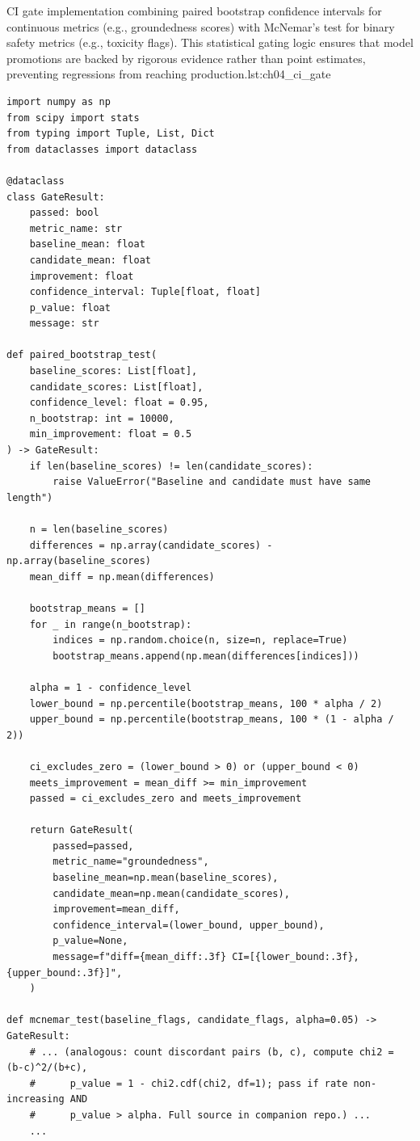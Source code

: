 \begin{codebox}{CI gate implementation combining paired bootstrap confidence intervals for continuous metrics (e.g., groundedness scores) with McNemar's test for binary safety metrics (e.g., toxicity flags). This statistical gating logic ensures that model promotions are backed by rigorous evidence rather than point estimates, preventing regressions from reaching production.}{lst:ch04_ci_gate}
\begin{verbatim}
import numpy as np
from scipy import stats
from typing import Tuple, List, Dict
from dataclasses import dataclass

@dataclass
class GateResult:
    passed: bool
    metric_name: str
    baseline_mean: float
    candidate_mean: float
    improvement: float
    confidence_interval: Tuple[float, float]
    p_value: float
    message: str

def paired_bootstrap_test(
    baseline_scores: List[float],
    candidate_scores: List[float],
    confidence_level: float = 0.95,
    n_bootstrap: int = 10000,
    min_improvement: float = 0.5
) -> GateResult:
    if len(baseline_scores) != len(candidate_scores):
        raise ValueError("Baseline and candidate must have same length")

    n = len(baseline_scores)
    differences = np.array(candidate_scores) - np.array(baseline_scores)
    mean_diff = np.mean(differences)

    bootstrap_means = []
    for _ in range(n_bootstrap):
        indices = np.random.choice(n, size=n, replace=True)
        bootstrap_means.append(np.mean(differences[indices]))

    alpha = 1 - confidence_level
    lower_bound = np.percentile(bootstrap_means, 100 * alpha / 2)
    upper_bound = np.percentile(bootstrap_means, 100 * (1 - alpha / 2))

    ci_excludes_zero = (lower_bound > 0) or (upper_bound < 0)
    meets_improvement = mean_diff >= min_improvement
    passed = ci_excludes_zero and meets_improvement

    return GateResult(
        passed=passed,
        metric_name="groundedness",
        baseline_mean=np.mean(baseline_scores),
        candidate_mean=np.mean(candidate_scores),
        improvement=mean_diff,
        confidence_interval=(lower_bound, upper_bound),
        p_value=None,
        message=f"diff={mean_diff:.3f} CI=[{lower_bound:.3f},{upper_bound:.3f}]",
    )

def mcnemar_test(baseline_flags, candidate_flags, alpha=0.05) -> GateResult:
    # ... (analogous: count discordant pairs (b, c), compute chi2 = (b-c)^2/(b+c),
    #      p_value = 1 - chi2.cdf(chi2, df=1); pass if rate non-increasing AND
    #      p_value > alpha. Full source in companion repo.) ...
    ...


\end{verbatim}
\end{codebox}
